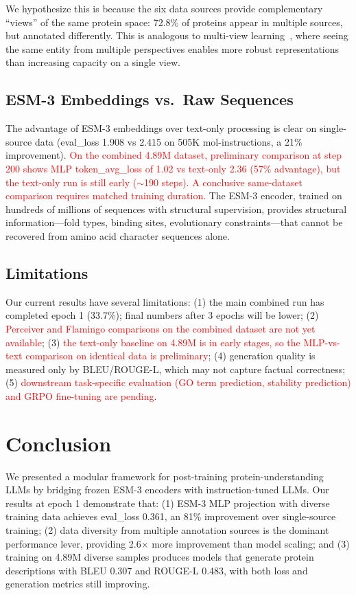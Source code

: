\documentclass[11pt]{article}
\begin{document}
We hypothesize this is because the six data sources provide complementary ``views'' of the same protein space: 72.8\% of proteins appear in multiple sources, but annotated differently. This is analogous to multi-view learning~\cite{zhao2017multi}, where seeing the same entity from multiple perspectives enables more robust representations than increasing capacity on a single view.

\subsection{ESM-3 Embeddings vs.\ Raw Sequences}

The advantage of ESM-3 embeddings over text-only processing is clear on single-source data (eval\_loss 1.908 vs 2.415 on 505K mol-instructions, a 21\% improvement). \textcolor{red}{On the combined 4.89M dataset, preliminary comparison at step 200 shows MLP token\_avg\_loss of 1.02 vs text-only 2.36 (57\% advantage), but the text-only run is still early ($\sim$190 steps). A conclusive same-dataset comparison requires matched training duration.} The ESM-3 encoder, trained on hundreds of millions of sequences with structural supervision, provides structural information---fold types, binding sites, evolutionary constraints---that cannot be recovered from amino acid character sequences alone.

\subsection{Limitations}

Our current results have several limitations: (1) the main combined run has completed epoch 1 (33.7\%); final numbers after 3 epochs will be lower; (2) \textcolor{red}{Perceiver and Flamingo comparisons on the combined dataset are not yet available}; (3) \textcolor{red}{the text-only baseline on 4.89M is in early stages, so the MLP-vs-text comparison on identical data is preliminary}; (4) generation quality is measured only by BLEU/ROUGE-L, which may not capture factual correctness; (5) \textcolor{red}{downstream task-specific evaluation (GO term prediction, stability prediction) and GRPO fine-tuning are pending}.

\section{Conclusion}

We presented a modular framework for post-training protein-understanding LLMs by bridging frozen ESM-3 encoders with instruction-tuned LLMs. Our results at epoch 1 demonstrate that: (1) ESM-3 MLP projection with diverse training data achieves eval\_loss 0.361, an 81\% improvement over single-source training; (2) data diversity from multiple annotation sources is the dominant performance lever, providing 2.6$\times$ more improvement than model scaling; and (3) training on 4.89M diverse samples produces models that generate protein descriptions with BLEU 0.307 and ROUGE-L 0.483, with both loss and generation metrics still improving.
\end{document}

